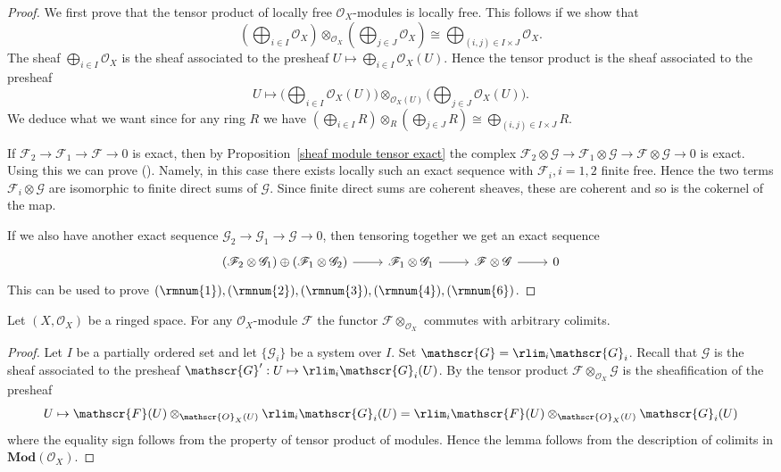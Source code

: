 \begin{proof}
We first prove that the tensor product of locally free $\mathscr{O}_X$-modules is locally free. This follows if we show that \[(\bigoplus_{i\in I}\mathscr{O}_X)\otimes_{\mathscr{O}_X}(\bigoplus_{j\in J}\mathscr{O}_X)\cong\bigoplus_{(i,j)\in I\times J}\mathscr{O}_X.\]
The sheaf $\bigoplus_{i\in I}\mathscr{O}_X$ is the sheaf associated to the presheaf $U\mapsto\bigoplus_{i\in I}\mathscr{O}_X(U)$. Hence the tensor product is the sheaf associated to the presheaf
\[U\mapsto\Big(\bigoplus_{i\in I}\mathscr{O}_X(U)\Big)\otimes_{\mathscr{O}_X(U)}\Big(\bigoplus_{j\in J}\mathscr{O}_X(U)\Big).\]
We deduce what we want since for any ring $R$ we have $(\bigoplus_{i\in I}R)\otimes_{R}(\bigoplus_{j\in J}R)\cong\bigoplus_{(i,j)\in I\times J}R$.\par
If $\mathscr{F}_2\to\mathscr{F}_1\to\mathscr{F}\to0$ is exact, then by Proposition~\ref{sheaf module tensor exact} the complex $\mathscr{F}_2\otimes\mathscr{G}\to\mathscr{F}_1\otimes\mathscr{G}\to\mathscr{F}\otimes\mathscr{G}\to 0$ is exact. Using this we can prove (). Namely, in this case there exists locally such an exact sequence with $\mathscr{F}_i,i=1,2$ finite free. Hence the two terms $\mathscr{F}_i\otimes\mathscr{G}$ are isomorphic to finite direct sums of $\mathscr{G}$. Since finite direct sums are coherent sheaves, these are coherent and so is the cokernel of the map.\par
If we also have another exact sequence $\mathscr{G}_2\to\mathscr{G}_1\to\mathscr{G}\to0$, then tensoring together we get an exact sequence
\[\begin{tikzcd}
(\mathscr{F}_2\otimes\mathscr{G}_1)\oplus(\mathscr{F}_1\otimes\mathscr{G}_2)\ar[r]&\mathscr{F}_1\otimes\mathscr{G}_1\ar[r]&\mathscr{F}\otimes\mathscr{G}\ar[r]&0
\end{tikzcd}\]
This can be used to prove $(\rmnum{1}),(\rmnum{2}),(\rmnum{3}),(\rmnum{4}),(\rmnum{6})$.
\end{proof}
\begin{proposition}\label{sheaf module tensor colim}
Let $(X,\mathscr{O}_X)$ be a ringed space. For any $\mathscr{O}_X$-module $\mathscr{F}$ the functor $\mathscr{F}\otimes_{\mathscr{O}_X}$ commutes with arbitrary colimits.
\end{proposition}
\begin{proof}
Let $I$ be a partially ordered set and let $\{\mathscr{G}_i\}$ be a system over $I$. Set $\mathscr{G}=\rlim_i\mathscr{G}_i$. Recall that $\mathscr{G}$ is the sheaf associated to the presheaf $\mathscr{G}':U\mapsto\rlim_i\mathscr{G}_i(U)$. By  the tensor product $\mathscr{F}\otimes_{\mathscr{O}_X}\mathscr{G}$ is the sheafification of the presheaf
\[U\mapsto\mathscr{F}(U)\otimes_{\mathscr{O}_X(U)}\rlim_i\mathscr{G}_i(U)=\rlim_i\mathscr{F}(U)\otimes_{\mathscr{O}_X(U)}\mathscr{G}_i(U)\]
where the equality sign follows from the property of tensor product of modules. Hence the lemma follows from the description of colimits in $\mathbf{Mod}(\mathscr{O}_X)$.
\end{proof}
